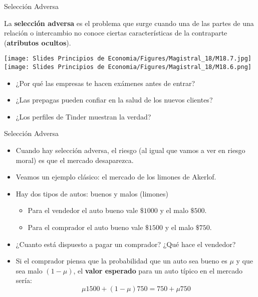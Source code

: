 \documentclass{beamer}
\begin{document}
\begin{frame}{Selección Adversa}
    \begin{boxB}
        \centering
        La \textbf{selección adversa} es el problema que surge cuando una de las partes de una relación o intercambio no conoce ciertas características de la contraparte (\textbf{atributos ocultos}).
    \end{boxB}
    \vspace{2mm}
    \centering
    \texttt{[image: Slides Principios de Economia/Figures/Magistral\_18/M18.7.jpg]} \hspace{2mm}
    \texttt{[image: Slides Principios de Economia/Figures/Magistral\_18/M18.6.png]}
    \vspace{2mm}
    \begin{itemize}
        \item ¿Por qué las empresas te hacen exámenes antes de entrar?
        \item ¿Las prepagas pueden confiar en la salud de los nuevos clientes?
        \item ¿Los perfiles de Tinder muestran la verdad?
    \end{itemize}
\end{frame}

\begin{frame}{Selección Adversa}
    \begin{itemize}
        \item Cuando hay selección adversa, el riesgo (al igual que vamos a ver en riesgo moral) es que el mercado desaparezca.
        \vspace{1mm}
        \item Veamos un ejemplo clásico: el mercado de los limones de Akerlof.
        \vspace{1mm}
        \item Hay dos tipos de autos: buenos y malos (limones)
        \begin{itemize}
            \item Para el vendedor el auto bueno vale $\$1000$ y el malo $\$500$.
            \item Para el comprador el auto bueno vale $\$1500$ y el malo $\$750$.
        \end{itemize}
        \item ¿Cuanto está dispuesto a pagar un comprador? ¿Qué hace el vendedor?
        \item Si el comprador piensa que la probabilidad que un auto sea bueno es $\mu$ y que sea malo  $(1-\mu)$, el \textbf{valor esperado} para un auto típico en el mercado sería:
        \[\mu 1500 + (1-\mu) 750= 750 + \mu 750\] 
    \end{itemize}
\end{frame}
\end{document}
